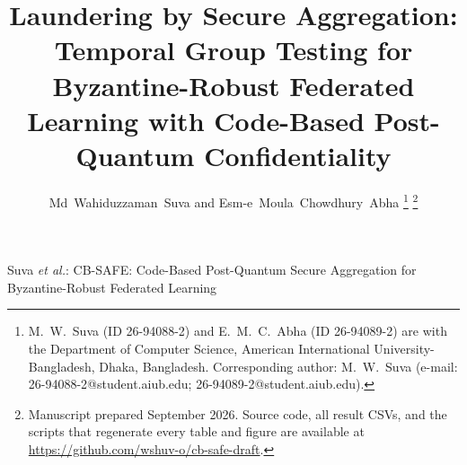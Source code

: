 \documentclass[lettersize,journal]{IEEEtran}
\begin{document}
\title{Laundering by Secure Aggregation: Temporal Group Testing for Byzantine-Robust
Federated Learning with Code-Based Post-Quantum Confidentiality}

\author{Md~Wahiduzzaman~Suva and Esm-e~Moula~Chowdhury~Abha%
\thanks{M.~W.~Suva (ID 26-94088-2) and E.~M.~C.~Abha (ID 26-94089-2) are with the
Department of Computer Science, American International University-Bangladesh,
Dhaka, Bangladesh. Corresponding author: M.~W.~Suva
(e-mail: 26-94088-2@student.aiub.edu; 26-94089-2@student.aiub.edu).}%
\thanks{Manuscript prepared September 2026. Source code, all result CSVs, and the
scripts that regenerate every table and figure are available at
\url{https://github.com/wshuv-o/cb-safe-draft}.}}

%
{Suva \MakeLowercase{\textit{et al.}}: CB-SAFE: Code-Based Post-Quantum Secure Aggregation for Byzantine-Robust Federated Learning}

\maketitle
\end{document}
